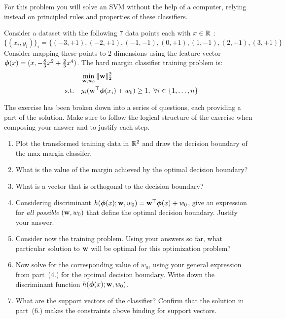\documentclass[submit]{harvardml}
\begin{document}
\newpage
\begin{problem}
  For this problem you will solve an SVM without the help of a
  computer, relying instead on principled rules and properties of
  these classifiers.

Consider a dataset with the following 7 data points each with $x \in \mathbb{R}$ : \[\{(x_i, y_i)\}_i =\{(-3 , +1) , (-2 , +1 ) , (-1,  -1 ), (0, +1), ( 1 , -1 ), ( 2 , +1 ) , ( 3 , +1 )\}\] Consider
mapping these points to $2$ dimensions using the feature vector $\boldsymbol{\phi}(x) =  (x, -\frac{8}{3}x^2 + \frac{2}{3}x^4 )$. The hard margin classifier training problem is:
%
\begin{align*}
  &\min_{\mathbf{w}, w_0} \|\mathbf{w}\|_2^2 \label{eq:dcp} \\
  \quad \text{s.t.} \quad & y_i(\mathbf{w}^\top \boldsymbol{\phi}(x_i) + w_0) \geq 1,~\forall i \in \{1,\ldots, n\}\notag
\end{align*}

The exercise has been broken down into a series of questions, each
providing a part of the solution. Make sure to follow the logical structure of
the exercise when composing your answer and to justify each step.

\begin{enumerate}
\item Plot the transformed training data in $\mathbb{R}^2$ and draw the decision boundary
of the max margin classifer.
%
\item  What is the value of the margin achieved by the optimal
decision boundary? 
%
\item What is a vector that is orthogonal to the decision boundary?

%
\item Considering discriminant $h(\boldsymbol{\phi}(x);\mathbf{w},w_0)=\mathbf{w}^\top\boldsymbol{\phi}(x) +w_0$, 
give an expression for {\em all possible} $(\mathbf{w},w_0)$ that define
the optimal decision boundary. Justify your answer.

  \item Consider now the training problem. Using your answers so far,
    what particular solution to $\mathbf{w}$ will be optimal for this
    optimization problem?

  \item Now solve for the corresponding value of $w_0$, using your
    general expression from part~(4.) for the optimal decision
    boundary.  Write down the discriminant function
    $h(\boldsymbol{\phi}(x);\mathbf{w},w_0)$.


\item What are the support vectors of the classifier?  Confirm that
  the solution in part~(6.) makes the constraints above binding for
  support vectors.

\end{enumerate}

\end{problem}
\end{document}
